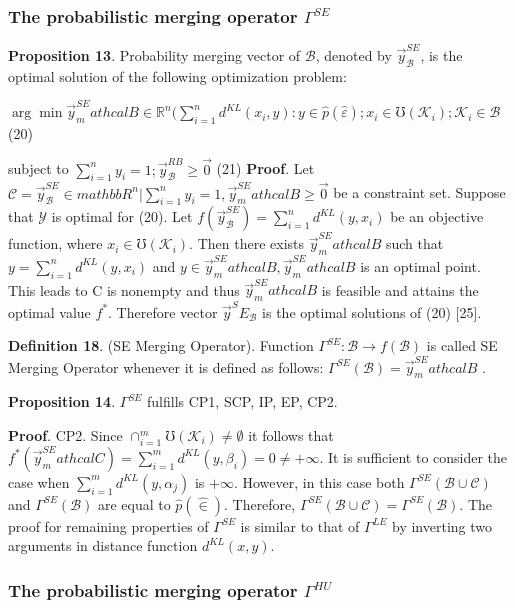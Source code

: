 \documentclass[]{iosart2c}
\begin{document}
\subsubsection{The probabilistic merging operator $\Gamma^{SE}$}

\textbf{Proposition 13}. Probability merging vector of $\mathcal{B}$,
denoted by $\vec{y}^{SE}_\mathcal{B}$, is the optimal solution of the following optimization problem:

$\arg \min\vec{y}^{SE}_mathcal{B} \in \mathbb{R}^n (
\sum^n_{i=1} d^{KL}(x_i, y) :
y \in \hat{p}(\hat{\varepsilon}); x_i \in \mho(\mathcal{K}_i);\mathcal{K}_i \in \mathcal{B}$ (20)

subject to $\sum^n_{i=1} y_i = 1; \vec{y}^{RB}_\mathcal{B}\geq\vec{0}$ (21)
\textbf{Proof}. Let $\mathcal{C} = {\vec{y}^{SE}_\mathcal{B} \in mathbb{R}^n|\sum^n_{i=1} y_i = 1, \vec{y}^{SE}_mathcal{B}\geq\vec{0}}$ 
be a constraint set. Suppose that $\mathcal{Y}$ is optimal for  
(20). Let $f(\vec{y}^{SE}_\mathcal{B})= \sum^n_{i=1} d^{KL}(y, x_i)$ be an objective function, 
where $x_i \in \mho(\mathcal{K}_i)$. Then there exists $\vec{y}^{SE}_mathcal{B}$ 
such that $y = \sum^n_{i=1} d^{KL}(y, x_i)$ and $y \in \vec{y}^{SE}_mathcal{B} ,\vec{y}^{SE}_mathcal{B}$ is 
an optimal point. This leads to C is nonempty and 
thus $\vec{y}^{SE}_mathcal{B}$ is feasible and attains the optimal value $f^*$. 
Therefore vector $\vec{y}^SE_\mathcal{B}$ is the optimal solutions of (20) 
[25]. 

\textbf{Definition 18}. (SE Merging Operator). Function 
$\Gamma^{SE} : \mathcal{B} \to f(\mathcal{B})$ is called SE Merging Operator 
whenever it is defined as follows: 
$\Gamma^{SE}(\mathcal{B}) = \vec{y}^{SE}_mathcal{B}$ . 

\textbf{Proposition 14}. 
$\Gamma^{SE}$ fulfills CP1, SCP, IP, EP, CP2. 

\textbf{Proof}. CP2. Since $\cap^m_{i=1}\mho(\mathcal{K}_i) \neq \emptyset$ it follows that 
$f^*(\vec{y}^{SE}_mathcal{C} ) = \sum^m_{i=1} d^{KL}(y, \beta_i) = 0 \neq +\infty$. It is sufficient 
to consider the case when $\sum^m_{i=1} d^{KL}(y, \alpha_j)$ 
is $+\infty$. However, in this case both $\Gamma^{SE}(\mathcal{B} \cup \mathcal{C})$ and 
$\Gamma^{SE}(\mathcal{B})$ are equal to $\hat{p}(\hat{\in})$. Therefore, $\Gamma^{SE}(\mathcal{B} \cup \mathcal{C}) = 
\Gamma^{SE}(\mathcal{B})$. The proof for remaining properties of $\Gamma^{SE}$ 
is similar to that of $\Gamma^{LE}$ by inverting two arguments 
in distance function $d^{KL}(x, y)$.

\subsubsection{The probabilistic merging operator $\Gamma^{HU}$}
\end{document}
